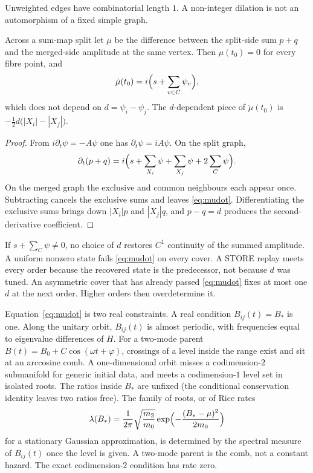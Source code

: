 Unweighted edges have combinatorial length \(1\).
A non-integer dilation is not an automorphism of a fixed simple graph.

\begin{lemma}
\label{lem:mu}
Across a sum-map split let \(\mu\) be the difference between the split-side
sum \(p+q\) and the merged-side amplitude at the same vertex.
Then \(\mu(t_0)=0\) for every fibre point, and
\begin{equation}
\label{eq:mudot}
\dot\mu(t_0)=i\Bigl(s+\sum_{v\in C}\psi_v\Bigr),
\end{equation}
which does not depend on \(d=\psi_i-\psi_j\).
The \(d\)-dependent piece of \(\ddot\mu(t_0)\) is
\(-\tfrac12 d\bigl(|X_i|-|X_j|\bigr)\).
\end{lemma}

\begin{proof}
From \(i\partial_t\psi=-A\psi\) one has \(\partial_t\psi=iA\psi\).
On the split graph,
\[
\partial_t(p+q)=i\Bigl(s+\sum_{X_i}\psi+\sum_{X_j}\psi+2\sum_C\psi\Bigr).
\]
On the merged graph the exclusive and common neighbours each appear once.
Subtracting cancels the exclusive sums and leaves \eqref{eq:mudot}.
Differentiating the exclusive sums brings down \(|X_i|p\) and \(|X_j|q\),
and \(p-q=d\) produces the second-derivative coefficient.
\end{proof}

If \(s+\sum_C\psi\neq 0\), no choice of \(d\) restores \(C^1\) continuity of
the summed amplitude.
A uniform nonzero state fails \eqref{eq:mudot} on every cover.
A STORE replay meets every order because the recovered state is the
predecessor, not because \(d\) was tuned.
An asymmetric cover that has already passed \eqref{eq:mudot} fixes at most
one \(d\) at the next order. Higher orders then overdetermine it.

Equation~\eqref{eq:mudot} is two real constraints.
A real condition \(B_{ij}(t)=B_*\) is one.
Along the unitary orbit, \(B_{ij}(t)\) is almost periodic, with frequencies
equal to eigenvalue differences of \(H\).
For a two-mode parent
\(B(t)=B_0+C\cos(\omega t+\varphi)\),
crossings of a level inside the range exist and sit at an arccosine comb.
A one-dimensional orbit misses a codimension-\(2\) submanifold for generic
initial data, and meets a codimension-\(1\) level set in isolated roots.
The ratios inside \(B_*\) are unfixed (the conditional conservation identity
leaves two ratios free).
The family of roots, or of Rice rates
\[
\lambda(B_*)=\frac{1}{2\pi}\sqrt{\frac{m_2}{m_0}}
\exp\Bigl(-\frac{(B_*-\mu)^2}{2m_0}\Bigr)
\]
for a stationary Gaussian approximation, is determined by the spectral
measure of \(B_{ij}(t)\) once the level is given.
A two-mode parent is the comb, not a constant hazard.
The exact codimension-\(2\) condition has rate zero.

